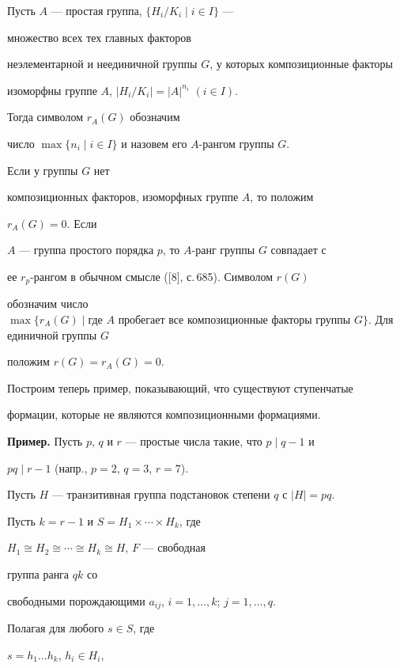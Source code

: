 Пусть $A$ --- простая группа, $\{H_i/K_i\mid i\in I\}$ ---


множество всех тех главных факторов


неэлементарной и неединичной группы $G$, у которых композиционные факторы


изоморфны группе $A$, $|H_i/K_i|=|A|^{n_i}$ $(i\in I)$.


Тогда символом $r_A(G)$ обозначим


число $\max\{n_i\mid i\in I\}$ и назовем его $A$-рангом группы $G$.


Если у группы $G$ нет


композиционных факторов, изоморфных группе $A$, то положим


$r_A(G)=0$. Если


$A$ --- группа простого порядка $p$, то $A$-ранг группы $G$ совпадает с


ее $r_p$-рангом в обычном смысле ([8], с.\,685). Символом $r(G)$


обозначим число $\max\{r_A(G)\mid\text{где $A$ пробегает все


композиционные факторы группы } G\}$. Для единичной группы $G$


положим $r(G)=r_A(G)=0$.





Построим теперь пример, показывающий, что существуют ступенчатые


формации, которые не являются композиционными формациями.


\medskip





{\bf Пример.} Пусть $p$, $q$ и $r$ --- простые числа такие, что $p\mid q-1$ и


$pq\mid r-1$ (напр., $p=2$, $q=3$, $r=7$).





Пусть $H$ --- транзитивная группа подстановок степени $q$ с $|H|=pq$.


Пусть $k=r-1$ и $S=H_1\times\dotsb\times H_k$, где


$H_1\cong H_2\cong\dotsb\cong H_k\cong H$, $F$ --- свободная


группа ранга $qk$ со


свободными порождающими $a_{ij}$, $i=1,\dotsc,k$; $j=1,\dotsc,q$.


Полагая для любого $s\in S$, где


$s=h_1\dotsc h_k$, $h_i\in H_i$,


